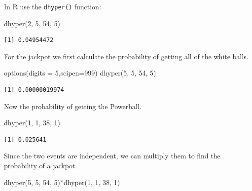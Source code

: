 \documentclass[
  letterpaper,
  DIV=11,
  numbers=noendperiod]{scrreprt}
\newenvironment{Shaded}{\begin{snugshade}}{\end{snugshade}}
\newcommand{\AttributeTok}[1]{\textcolor[rgb]{0.40,0.45,0.13}{#1}}
\newcommand{\DecValTok}[1]{\textcolor[rgb]{0.68,0.00,0.00}{#1}}
\newcommand{\FunctionTok}[1]{\textcolor[rgb]{0.28,0.35,0.67}{#1}}
\newcommand{\NormalTok}[1]{\textcolor[rgb]{0.00,0.23,0.31}{#1}}
\newcommand{\SpecialCharTok}[1]{\textcolor[rgb]{0.37,0.37,0.37}{#1}}
\begin{document}
In R use the \texttt{dhyper()} function:

\begin{Shaded}
\begin{Highlighting}[numbers=left,,]
\FunctionTok{dhyper}\NormalTok{(}\DecValTok{2}\NormalTok{, }\DecValTok{5}\NormalTok{, }\DecValTok{54}\NormalTok{, }\DecValTok{5}\NormalTok{)}
\end{Highlighting}
\end{Shaded}

\begin{verbatim}
[1] 0.04954472
\end{verbatim}

For the jackpot we first calculate the probability of getting all of the
white balls.

\begin{Shaded}
\begin{Highlighting}[numbers=left,,]
\FunctionTok{options}\NormalTok{(}\AttributeTok{digits =} \DecValTok{5}\NormalTok{,}\AttributeTok{scipen=}\DecValTok{999}\NormalTok{)}
\FunctionTok{dhyper}\NormalTok{(}\DecValTok{5}\NormalTok{, }\DecValTok{5}\NormalTok{, }\DecValTok{54}\NormalTok{, }\DecValTok{5}\NormalTok{)}
\end{Highlighting}
\end{Shaded}

\begin{verbatim}
[1] 0.00000019974
\end{verbatim}

Now the probability of getting the Powerball.

\begin{Shaded}
\begin{Highlighting}[numbers=left,,]
\FunctionTok{dhyper}\NormalTok{(}\DecValTok{1}\NormalTok{, }\DecValTok{1}\NormalTok{, }\DecValTok{38}\NormalTok{, }\DecValTok{1}\NormalTok{)}
\end{Highlighting}
\end{Shaded}

\begin{verbatim}
[1] 0.025641
\end{verbatim}

Since the two events are independent, we can multiply them to find the
probability of a jackpot.

\begin{Shaded}
\begin{Highlighting}[numbers=left,,]
\FunctionTok{dhyper}\NormalTok{(}\DecValTok{5}\NormalTok{, }\DecValTok{5}\NormalTok{, }\DecValTok{54}\NormalTok{, }\DecValTok{5}\NormalTok{)}\SpecialCharTok{*}\FunctionTok{dhyper}\NormalTok{(}\DecValTok{1}\NormalTok{, }\DecValTok{1}\NormalTok{, }\DecValTok{38}\NormalTok{, }\DecValTok{1}\NormalTok{)}
\end{Highlighting}
\end{Shaded}
\end{document}
